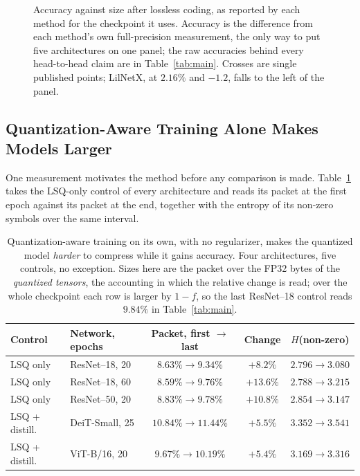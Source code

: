 \documentclass{article}
\begin{document}
\begin{figure}[t]
  \caption{Accuracy against size after lossless coding, as reported by each method
  for the checkpoint it uses. Accuracy is the difference from each method's own
  full-precision measurement, the only way to put five architectures on one panel;
  the raw accuracies behind every head-to-head claim are in
  Table~\ref{tab:main}. Crosses are single published points; LilNetX, at $2.16\%$
  and $-1.2$, falls to the left of the panel.}
  \label{fig:frontier}
\end{figure}

\subsection{Quantization-Aware Training Alone Makes Models Larger}
\label{sec:qat-fattens}

One measurement motivates the method before any comparison is made.
Table~\ref{tab:fatten} takes the LSQ-only control of every architecture and reads
its packet at the first epoch against its packet at the end, together with the
entropy of its non-zero symbols over the same interval.

\begin{table}[ht]
  \caption{Quantization-aware training on its own, with no regularizer, makes the
  quantized model \emph{harder} to compress while it gains accuracy. Four
  architectures, five controls, no exception. Sizes here are the packet over the
  FP32 bytes of the \emph{quantized tensors}, the accounting in which the relative
  change is read; over the whole checkpoint each row is larger by $1-f$, so the
  last ResNet--18 control reads $9.84\%$ in Table~\ref{tab:main}.}
  \label{tab:fatten}
  \centering \small
  \begin{tabular}{llccc}
    \toprule
    Control & Network, epochs & Packet, first $\to$ last & Change & $H$(non-zero) \\
    \midrule
    LSQ only & ResNet--18, 20 & $8.63\% \to 9.34\%$ & $+8.2\%$ & $2.796 \to 3.080$ \\
    LSQ only & ResNet--18, 60 & $8.59\% \to 9.76\%$ & $\mathbf{+13.6\%}$ & $2.788 \to 3.215$ \\
    LSQ only & ResNet--50, 20 & $8.83\% \to 9.78\%$ & $+10.8\%$ & $2.854 \to 3.147$ \\
    LSQ + distill. & DeiT-Small, 25 & $10.84\% \to 11.44\%$ & $+5.5\%$ & $3.352 \to 3.541$ \\
    LSQ + distill. & ViT-B/16, 20 & $9.67\% \to 10.19\%$ & $+5.4\%$ & $3.169 \to 3.316$ \\
    \bottomrule
  \end{tabular}
\end{table}
\end{document}

